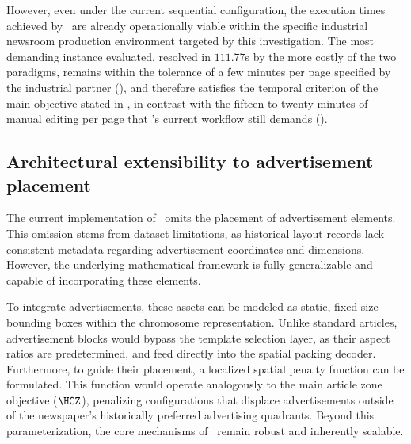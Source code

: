 However, even under the current sequential configuration, the execution times achieved by \methodNameGeneral\ are already operationally viable within the specific industrial newsroom production environment targeted by this investigation. The most demanding instance evaluated, resolved in $111.77$s by the more costly of the two paradigms, remains within the tolerance of a few minutes per page specified by the industrial partner (), and therefore satisfies the temporal criterion of the main objective stated in , in contrast with the fifteen to twenty minutes of manual editing per page that \melody's current workflow still demands ().




\subsection*{Architectural extensibility to advertisement placement}
The current implementation of \methodNameGeneral\ omits the placement of advertisement elements. This omission stems from dataset limitations, as historical layout records lack consistent metadata regarding advertisement coordinates and dimensions. However, the underlying mathematical framework is fully generalizable and capable of incorporating these elements.

To integrate advertisements, these assets can be modeled as static, fixed-size bounding boxes within the chromosome representation. Unlike standard articles, advertisement blocks would bypass the template selection layer, as their aspect ratios are predetermined, and feed directly into the spatial packing decoder. Furthermore, to guide their placement, a localized spatial penalty function can be formulated. This function would operate analogously to the main article zone objective ($\HCZ$), penalizing configurations that displace advertisements outside of the newspaper's historically preferred advertising quadrants. 
Beyond this parameterization, the core mechanisms of \methodNameGeneral\ remain robust and inherently scalable.

